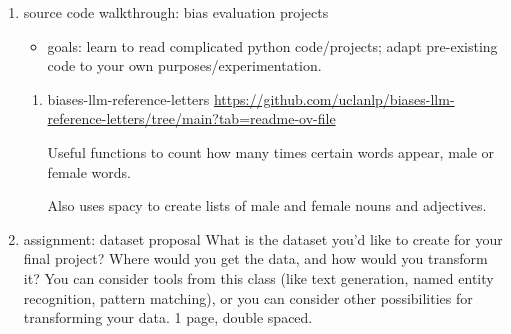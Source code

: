 \documentclass[11pt]{article}
\begin{document}
\begin{enumerate}
\begin{enumerate}
\item source code walkthrough: bias evaluation projects
\label{sec:org8431e53}
\begin{itemize}
\item goals: learn to read complicated python code/projects; adapt
pre-existing code to your own purposes/experimentation.
\end{itemize}
\begin{enumerate}
\item biases-llm-reference-letters
\label{sec:org4b87eee}
\url{https://github.com/uclanlp/biases-llm-reference-letters/tree/main?tab=readme-ov-file}

Useful functions to count how many times certain words appear, male or
female words.

Also uses spacy to create lists of male and female nouns and
adjectives.
\end{enumerate}

\item assignment: dataset proposal
\label{sec:org0cf8dae}
What is the dataset you'd like to create for your final project? Where
would you get the data, and how would you transform it? You can
consider tools from this class (like text generation, named entity
recognition, pattern matching), or you can consider other
possibilities for transforming your data. 1 page, double spaced.
\end{enumerate}
\end{enumerate}
\end{document}
